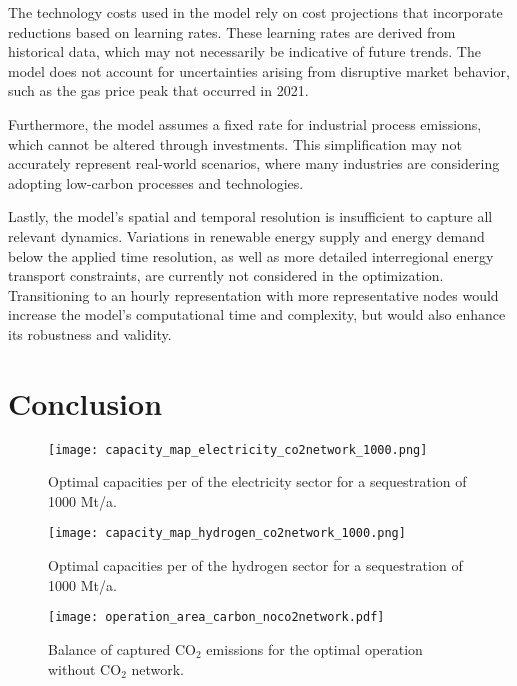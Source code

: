 \documentclass[conference]{IEEEtran}
\newcommand{\carbon}{CO$_2$ }
\begin{document}
The technology costs used in the model rely on cost projections that incorporate reductions based on learning rates. These learning rates are derived from historical data, which may not necessarily be indicative of future trends. The model does not account for uncertainties arising from disruptive market behavior, such as the gas price peak that occurred in 2021.

Furthermore, the model assumes a fixed rate for industrial process emissions, which cannot be altered through investments. This simplification may not accurately represent real-world scenarios, where many industries are considering adopting low-carbon processes and technologies.

Lastly, the model's spatial and temporal resolution is insufficient to capture all relevant dynamics. Variations in renewable energy supply and energy demand below the applied time resolution, as well as more detailed interregional energy transport constraints, are currently not considered in the optimization. Transitioning to an hourly representation with more representative nodes would increase the model's computational time and complexity, but would also enhance its robustness and validity.

\section{Conclusion}
\label{sec:conclusion}




\newpage

\printbibliography

\appendix

\begin{figure}[h]
    \centering
    \texttt{[image: capacity\_map\_electricity\_co2network\_1000.png]}
    \caption{Optimal capacities per of the electricity sector for a sequestration of 1000 Mt/a.}
    \label{fig:capacity_map_electricity_co2network_1000}
\end{figure}


\begin{figure}[h]
    \centering
    \texttt{[image: capacity\_map\_hydrogen\_co2network\_1000.png]}
    \caption{Optimal capacities per of the hydrogen sector for a sequestration of 1000 Mt/a.}
    \label{fig:capacity_map_hydrogen_co2network_1000}
\end{figure}

\begin{figure}
    \centering
    \texttt{[image: operation\_area\_carbon\_noco2network.pdf]}
    \caption{Balance of captured \carbon emissions for the optimal operation without \carbon network.}
    \label{fig:operation_area_carbon_noco2network}
\end{figure}
\end{document}
